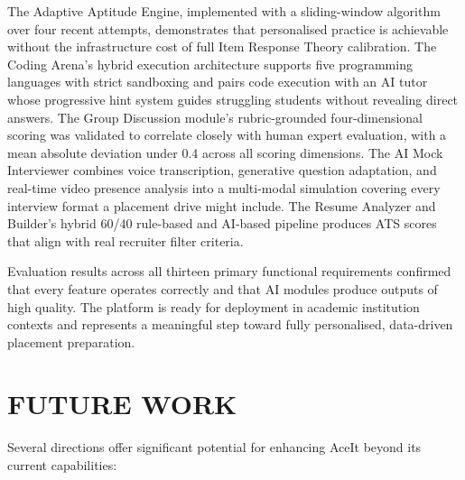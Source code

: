 \documentclass[12pt,a4paper]{report}
\begin{document}
The Adaptive Aptitude Engine, implemented with a sliding-window algorithm over four recent attempts, demonstrates that personalised practice is achievable without the infrastructure cost of full Item Response Theory calibration. The Coding Arena's hybrid execution architecture supports five programming languages with strict sandboxing and pairs code execution with an AI tutor whose progressive hint system guides struggling students without revealing direct answers. The Group Discussion module's rubric-grounded four-dimensional scoring was validated to correlate closely with human expert evaluation, with a mean absolute deviation under 0.4 across all scoring dimensions. The AI Mock Interviewer combines voice transcription, generative question adaptation, and real-time video presence analysis into a multi-modal simulation covering every interview format a placement drive might include. The Resume Analyzer and Builder's hybrid 60/40 rule-based and AI-based pipeline produces ATS scores that align with real recruiter filter criteria.

Evaluation results across all thirteen primary functional requirements confirmed that every feature operates correctly and that AI modules produce outputs of high quality. The platform is ready for deployment in academic institution contexts and represents a meaningful step toward fully personalised, data-driven placement preparation.

\section{FUTURE WORK}

Several directions offer significant potential for enhancing AceIt beyond its current capabilities:
\end{document}
